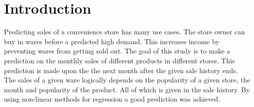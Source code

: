 

\section{Introduction}
Predicting sales of a convenience store has many use cases. The store owner can buy in wares before a predicted high demand. This increases income by preventing wares from getting sold out.
\newline %
The goal of this study is to make a prediction on the monthly sales of different products in different stores. This prediction is made upon the the next month after the given sale history ends. The sales of a given ware logically depends on the popularity of a given store, the month and popularity of the product. All of which is given in the sale history.
\newline %
By using non-linear methods for regression a good prediction was achieved.
\nocite{imt_software_wiki}  %